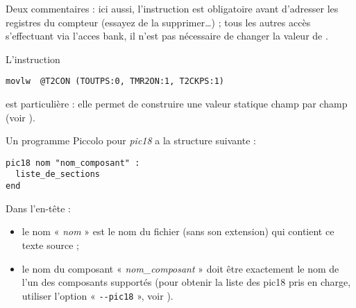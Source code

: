 Deux commentaires : ici aussi, l’instruction  est obligatoire avant d’adresser les registres du compteur (essayez de la supprimer…) ; tous les autres accès s’effectuant via l’acces bank, il n’est pas nécessaire de changer la valeur de .

L’instruction
\begin{lstlisting}[language=piccolo]
  movlw  @T2CON (TOUTPS:0, TMR2ON:1, T2CKPS:1)
\end{lstlisting}
est particulière : elle permet de construire une valeur statique champ par champ (voir ).








Un programme Piccolo pour \emph{pic18} a la structure suivante :

\begin{lstlisting}[language=piccolo]
pic18 nom "nom_composant" :
  liste_de_sections
end
\end{lstlisting}


Dans l’en-tête :
\begin{itemize}
  \item le nom « \emph{nom} » est le nom du fichier (sans son extension) qui contient ce texte source ;
  \item le nom du composant « \emph{nom\_composant} » doit être exactement le nom de l’un des composants supportés (pour obtenir la liste des pic18 pris en charge, utiliser l’option « \texttt{-{}-pic18} », voir ).
\end{itemize}


